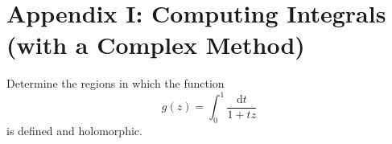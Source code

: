 \section*{Appendix I: Computing Integrals (with a Complex Method)}
\begin{problem}
Determine the regions in which the function 
$$g(z)=\int_0^1\frac{\mathrm{d}t}{1+tz}$$
is defined and holomorphic.
\end{problem}